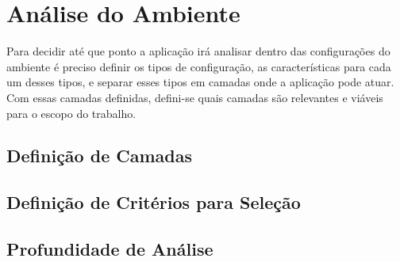 \section{Análise do Ambiente}
Para decidir até que ponto a aplicação irá analisar dentro das configurações
do ambiente é preciso definir os tipos de configuração, as características para
cada um desses tipos, e separar esses tipos em camadas onde a aplicação pode atuar.
Com essas camadas definidas, defini-se quais camadas são relevantes e viáveis
para o escopo do trabalho.

\subsection{Definição de Camadas}

\subsection{Definição de Critérios para Seleção}
\subsection{Profundidade de Análise}

